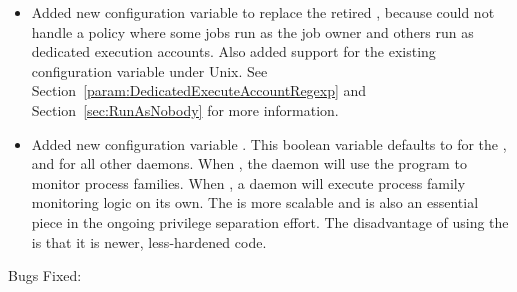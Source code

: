 \begin{itemize}
\item Added new configuration variable
   to replace the retired 
  ,
  because  could not
  handle a policy where some jobs run as the job owner and others run as
  dedicated execution accounts.  Also added support for
  the existing configuration variable
   under Unix.  See
  Section~\ref{param:DedicatedExecuteAccountRegexp} and
  Section~\ref{sec:RunAsNobody} for more information.

\item Added new configuration variable .
  This boolean variable defaults to  for the
  , and  for all other daemons.
  When , the daemon will use the
   program to monitor process families.
  When , a daemon will execute process family
  monitoring logic on its own.
  The  is more scalable and is also an essential
  piece in the ongoing privilege separation effort. The disadvantage of
  using the  is that it is newer, less-hardened code.

\end{itemize}

\noindent Bugs Fixed:

